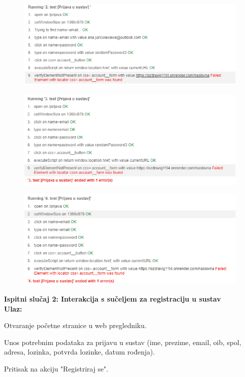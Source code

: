 \begin{figure}[H]
	\includegraphics[scale=0.6]{dijagrami/test12.PNG}
	\centering
	\label{fig:myChart}
\end{figure}

\begin{figure}[H]
	\includegraphics[scale=0.6]{dijagrami/test13.PNG}
	\centering
	\label{fig:myChart}
\end{figure}

\begin{figure}[H]
	\includegraphics[scale=0.6]{dijagrami/test14.PNG}
	\centering
	\label{fig:myChart}
\end{figure}




\noindent	\textbf{Ispitni slučaj 2: Interakcija s sučeljem za registraciju u sustav}
\\
\noindent \textbf{Ulaz:}
\begin{packed_enum}
	\item Otvaranje početne stranice u web pregledniku.
	\item Unos potrebnim podataka za prijavu u sustav (ime, prezime, email, oib, spol, adresa, lozinka, potvrda lozinke, datum rođenja).
	\item Pritisak na akciju "Registriraj se".
\end{packed_enum}

